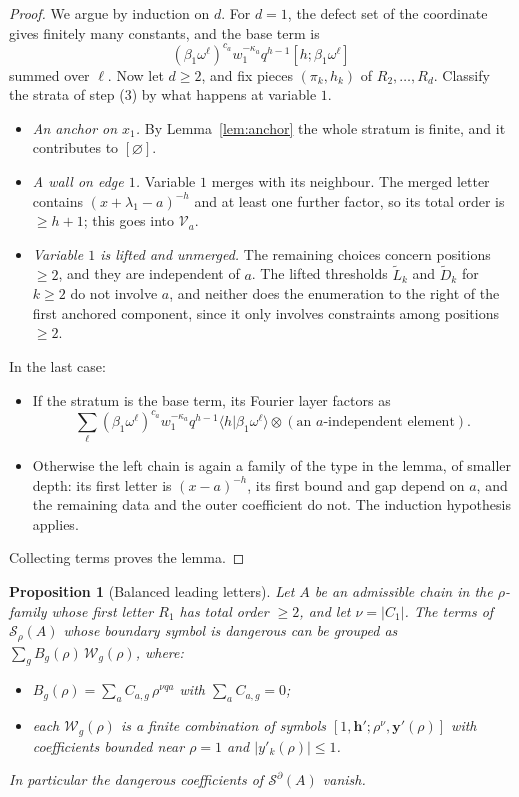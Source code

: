 \documentclass[11pt]{amsart}
\newtheorem{proposition}[theorem]{Proposition}
\theoremstyle{definition}
\theoremstyle{remark}
\numberwithin{equation}{section}
\newcommand{\cS}{\mathcal{S}}
\newcommand{\hb}{\mathbf{h}}
\newcommand{\yb}{\mathbf{y}}
\begin{document}
\begin{proof}
We argue by induction on $d$. For $d=1$, the defect set of the coordinate gives finitely many constants, and the base term is
\[
(\beta_1\omega^\ell)^{c_a}w_1^{-\kappa_a}q^{h-1}[h;\beta_1\omega^\ell]
\]
summed over $\ell$. Now let $d\ge2$, and fix pieces $(\pi_k,h_k)$ of $R_2,\dots,R_d$. Classify the strata of step (3) by what happens at variable $1$.
\begin{itemize}[leftmargin=1.5em]
\item \emph{An anchor on $x_1$.} By Lemma~\ref{lem:anchor} the whole stratum is finite, and it contributes to $[\varnothing]$.
\item \emph{A wall on edge $1$.} Variable $1$ merges with its neighbour. The merged letter contains $(x+\lambda_1-a)^{-h}$ and at least one further factor, so its total order is $\ge h+1$; this goes into $\mathcal V_a$.
\item \emph{Variable $1$ is lifted and unmerged.} The remaining choices concern positions $\ge2$, and they are independent of $a$. The lifted thresholds $\tilde L_k$ and $\tilde D_k$ for $k\ge2$ do not involve $a$, and neither does the enumeration to the right of the first anchored component, since it only involves constraints among positions $\ge2$.
\end{itemize}
In the last case:
\begin{itemize}[leftmargin=1.5em]
\item If the stratum is the base term, its Fourier layer factors as
\[
\sum_\ell(\beta_1\omega^\ell)^{c_a}w_1^{-\kappa_a}q^{h-1}\langle h|\beta_1\omega^\ell\rangle\otimes(\text{an $a$-independent element}).
\]
\item Otherwise the left chain is again a family of the type in the lemma, of smaller depth: its first letter is $(x-a)^{-h}$, its first bound and gap depend on $a$, and the remaining data and the outer coefficient do not. The induction hypothesis applies.
\end{itemize}
Collecting terms proves the lemma.
\end{proof}

\begin{proposition}[Balanced leading letters]\label{prop:balanced}
Let $A$ be an admissible chain in the $\rho$-family whose first letter $R_1$ has total order $\ge2$, and let $\nu=|C_1|$. The terms of $\cS_\rho(A)$ whose boundary symbol is dangerous can be grouped as $\sum_gB_g(\rho)\,\mathcal W_g(\rho)$, where:
\begin{itemize}[leftmargin=1.5em]
\item $B_g(\rho)=\sum_{a}C_{a,g}\,\rho^{\nu qa}$ with $\sum_aC_{a,g}=0$;
\item each $\mathcal W_g(\rho)$ is a finite combination of symbols $[1,\hb';\rho^{\nu},\yb'(\rho)]$ with coefficients bounded near $\rho=1$ and $|y'_k(\rho)|\le1$.
\end{itemize}
In particular the dangerous coefficients of $\cS^\partial(A)$ vanish.
\end{proposition}
\end{document}
